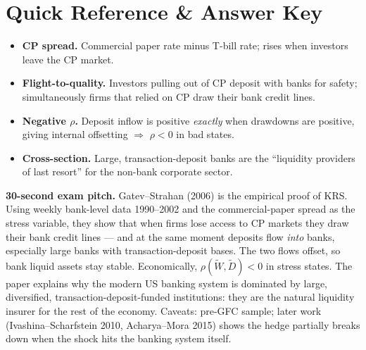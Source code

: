 \documentclass[11pt]{article}
\begin{document}
\section*{Quick Reference \& Answer Key}
\begin{answerbox}
\begin{itemize}
\item \textbf{CP spread.} Commercial paper rate minus T-bill rate; rises when investors leave the CP market.
\item \textbf{Flight-to-quality.} Investors pulling out of CP deposit with banks for safety; simultaneously firms that relied on CP draw their bank credit lines.
\item \textbf{Negative $\rho$.} Deposit inflow is positive \emph{exactly} when drawdowns are positive, giving internal offsetting $\Rightarrow$ $\rho<0$ in bad states.
\item \textbf{Cross-section.} Large, transaction-deposit banks are the ``liquidity providers of last resort'' for the non-bank corporate sector.
\end{itemize}
\end{answerbox}

\begin{keybox}
\textbf{30-second exam pitch.} Gatev--Strahan (2006) is the empirical proof of KRS. Using weekly bank-level data 1990--2002 and the commercial-paper spread as the stress variable, they show that when firms lose access to CP markets they draw their bank credit lines --- and at the same moment deposits flow \emph{into} banks, especially large banks with transaction-deposit bases. The two flows offset, so bank liquid assets stay stable. Economically, $\rho(\tilde W,\tilde D)<0$ in stress states. The paper explains why the modern US banking system is dominated by large, diversified, transaction-deposit-funded institutions: they are the natural liquidity insurer for the rest of the economy. Caveats: pre-GFC sample; later work (Ivashina--Scharfstein 2010, Acharya--Mora 2015) shows the hedge partially breaks down when the shock hits the banking system itself.
\end{keybox}
\end{document}
